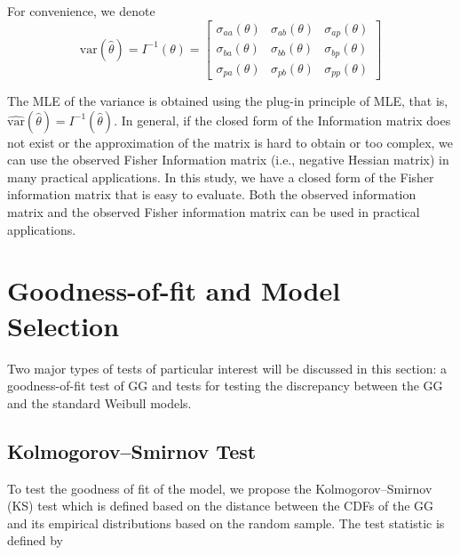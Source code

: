 \documentclass{ps}
\theoremstyle{plain}%
\theoremstyle{definition}
\theoremstyle{remark}
\begin{document}
For convenience, we denote
\begin{equation}\label{covariance-matrix}
	\mbox{var}(\hat{\theta}) = I^{-1}(\theta)=
	\begin{bmatrix}
		\sigma_{aa}(\theta) & \sigma_{ab}(\theta) & \sigma_{ap}(\theta) \\
		\sigma_{ba}(\theta) & \sigma_{bb}(\theta) & \sigma_{bp}(\theta) \\
		\sigma_{pa}(\theta) & \sigma_{pb}(\theta) & \sigma_{pp}(\theta)
	\end{bmatrix}
\end{equation}

The MLE of the variance is obtained using the plug-in principle of MLE, that is, $\widehat{\mbox{var}}(\hat{\theta}) = I^{-1}(\hat{\theta})$. In general, if the closed form of the Information matrix does not exist or the approximation of the matrix is hard to obtain or too complex, we can use the observed Fisher Information matrix (i.e., negative Hessian matrix) in many practical applications. In this study, we have a closed form of the Fisher information matrix that is easy to evaluate. Both the observed information matrix and the observed Fisher information matrix can be used in practical applications.


\section{Goodness-of-fit and Model Selection}\label{sec07:asymp-tests}


Two major types of tests of particular interest will be discussed in this section: a goodness-of-fit test of GG and tests for testing the discrepancy between the GG and the standard Weibull models.


\subsection{Kolmogorov–Smirnov Test}\label{sec7.1:KS-test}

To test the goodness of fit of the model, we propose the Kolmogorov–Smirnov (KS) test which is defined based on the distance between the CDFs of the GG and its empirical distributions based on the random sample. The test statistic is defined by
\end{document}
